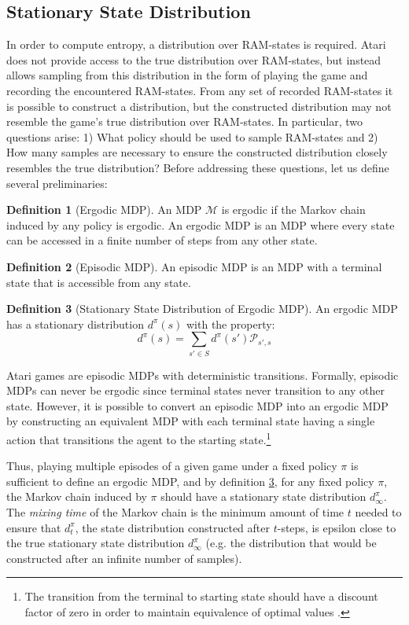 \documentclass{article} %
\theoremstyle{definition}
\newtheorem{definition}{Definition}[section]
\begin{document}
\subsection{Stationary State Distribution}
In order to compute entropy, a distribution over RAM-states is
required. Atari does not provide access to the true distribution over
RAM-states, but instead allows sampling from this distribution in the
form of playing the game and recording the encountered
RAM-states. From any set of recorded RAM-states it is possible to
construct a distribution, but the constructed distribution may not
resemble the game's true distribution over RAM-states. In particular,
two questions arise: 1) What policy should be used to sample
RAM-states and 2) How many samples are necessary to ensure the
constructed distribution closely resembles the true distribution?
Before addressing these questions, let us define several
preliminaries:

\begin{definition}[Ergodic MDP]
An MDP $\mathcal{M}$ is ergodic if the Markov chain induced by any
policy is ergodic. An ergodic MDP is an MDP where every state can be
accessed in a finite number of steps from any other state.
\end{definition}

\begin{definition}[Episodic MDP]
An episodic MDP is an MDP with a terminal state that is accessible
from any state.
\end{definition}

\begin{definition}[Stationary State Distribution of Ergodic MDP]
\label{def:ssd}
An ergodic MDP has a stationary distribution $d^{\pi}(s)$ with the property:
\[
d^\pi(s) = \sum_{s' \in S} d^\pi(s')\mathcal{P}_{s',s}
\]
\end{definition}

Atari games are episodic MDPs with deterministic transitions. Formally,
episodic MDPs can never be ergodic since terminal states never
transition to any other state. However, it is possible to convert an
episodic MDP into an ergodic MDP by constructing an equivalent MDP
with each terminal state having a single action that transitions the
agent to the starting state.\footnote{The transition from the terminal to
starting state should have a discount factor of zero in order to
maintain equivalence of optimal values \cite{VanHasselt11}.}

Thus, playing multiple episodes of a given game under a fixed policy
$\pi$ is sufficient to define an ergodic MDP, and by definition
\ref{def:ssd}, for any fixed policy $\pi$, the Markov chain induced by
$\pi$ should have a stationary state distribution $d^\pi_\infty$. The
\textit{mixing time} of the Markov chain is the minimum amount of time
$t$ needed to ensure that $d^\pi_t$, the state distribution
constructed after $t$-steps, is epsilon close to the true stationary
state distribution $d^\pi_\infty$ (e.g. the distribution that would be
constructed after an infinite number of samples).
\end{document}
